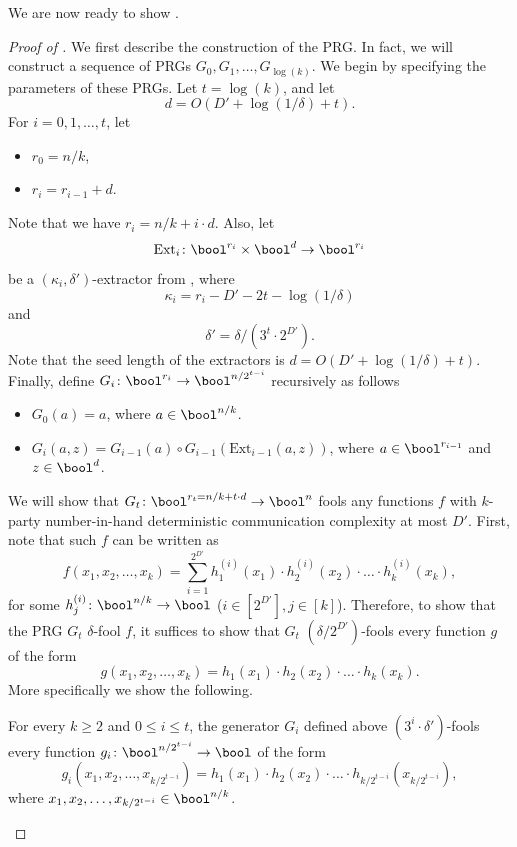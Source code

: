     We are now ready to show .
    
	\begin{proof}[Proof of ]\renewcommand{\qedsymbol}{$\square$ (\Cref{thm:prg-lc})}
	    We first describe the construction of the PRG. In fact, we will construct a sequence of PRGs $G_0,G_1,\dots,G_{\log(k)}$. We begin by specifying the parameters of these PRGs.
	    Let $t=\log(k)$, and let
	    \[
	    	d=O\left(D'+\log(1/\delta)+t\right).
	    \]
	    For $i=0,1,\dots,t$, let
	    \begin{itemize}
	        \item $r_0=n/k$,
	        \item $r_i=r_{i-1}+d$.
	    \end{itemize}
	    Note that we have $r_i=n/k+i\cdot d$. Also, let
	    \[
	    	\mathrm{Ext}_i\colon\bool^{r_i}\times\bool^d\to\bool^{r_i}
	    \]
	    be a $(\kappa_i,\delta')$-extractor from , where
	    \[
	    	\kappa_i=r_i-D'-2t - \log(1/\delta)
	    \] 
	    and
	    \[
	        \delta'=\delta/\left(3^t\cdot 2^{D'}\right).
	    \]
	    Note that the seed length of the extractors is $d=O\left(D'+\log(1/\delta)+t\right)$. Finally, define $G_i\colon\bool^{r_i}\to\bool^{n/2^{t-i}}$ recursively as follows
	    \begin{itemize}
	    	\item $G_{0}(a)=a$, where $a\in\bool^{n/k}$.
	    	\item $G_i(a,z)=G_{i-1}(a)\circ G_{i-1}(\mathrm{Ext}_{i-1}(a,z))$, where $a\in\bool^{r_{i-1}}$ and $z\in\bool^d$.
	    \end{itemize}
	    We will show that $G_t\colon\bool^{r_t=n/k+t\cdot d}\to\bool^n$ fools any functions $f$ with $k$-party number-in-hand deterministic communication complexity at most $D'$.
	    First, note that such $f$ can be written as
	    \[
	    	f(x_1,x_2,\dots,x_k)=\sum_{i=1}^{2^{D'}} h^{(i)}_{1}(x_1)\cdot h^{(i)}_{2}(x_2)\cdot\ldots\cdot h^{(i)}_{k}(x_k),
	    \]
	    for some $h^{(i)}_{j}\colon\bool^{n/k}\to \bool$ ($i\in\left[2^{D'}\right], j\in[k]$).
	    Therefore, to show that the PRG $G_t$ $\delta$-fool $f$, it suffices to show that $G_t$ $\left(\delta/2^{D'}\right)$-fools every function $g$ of the form
	    \[
	    	g(x_1,x_2,\dots,x_k)=h_1(x_1)\cdot h_2(x_2)\cdot\ldots\cdot h_k(x_k).
	    \]
	    More specifically we show the following.
	    
	    \begin{claim}\label{lem:prg-lc-claim-1}
	    	For every $k \geq 2$ and $  0\leq i \leq t$, the generator $G_i$ defined above $\left(3^{i}\cdot \delta'\right)$-fools every function $g_i\colon\bool^{n/2^{t-i}}\to\bool$ of the form
	    	\[
	    		g_i(x_1,x_2,\dots,x_{k/2^{t-i}})=h_1(x_1)\cdot h_2(x_2)\cdot\ldots\cdot h_{k/2^{t-i}}(x_{k/2^{t-i}}),
	    	\]
	    	where $x_1,x_2,\dots,x_{k/2^{t-i}}\in\bool^{n/k}$.
	    \end{claim}
	    

\end{proof}
